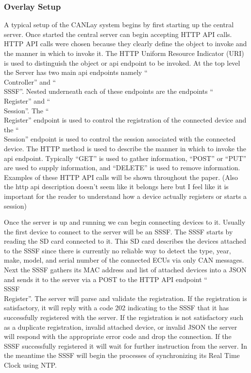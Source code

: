 \documentclass[letterpaper,twocolumn,12pt]{article}
\begin{document}
\subsubsection{Overlay Setup}
A typical setup of the CANLay system begins by first starting up the central server. Once started the central server can begin accepting HTTP API calls. HTTP API calls were chosen because they clearly define the object to invoke and the manner in which to invoke it. The HTTP Uniform Resource Indicator (URI) is used to distinguish the object or api endpoint to be invoked. At the top level the Server has two main api endpoints namely “\\Controller” and “\\SSSF”. Nested underneath each of these endpoints are the endpoints “\\Register” and “\\Session”. The “\\Register” endpoint is used to control the registration of the connected device and the “\\Session” endpoint is used to control the session associated with the connected device. The HTTP method is used to describe the manner in which to invoke the api endpoint. Typically “GET” is used to gather information, “POST” or “PUT” are used to supply information, and “DELETE” is used to remove information. Examples of these HTTP API calls will be shown throughout the paper. (Also the http api description doesn’t seem like it belongs here but I feel like it is important for the reader to understand how a device actually registers or starts a session)

Once the server is up and running we can begin connecting devices to it. Usually the first device to connect to the server will be an SSSF. The SSSF starts by reading the SD card connected to it. This SD card describes the devices attached to the SSSF since there is currently no reliable way to detect the type, year, make, model, and serial number of the connected ECUs via only CAN messages. Next the SSSF gathers its MAC address and list of attached devices into a JSON and sends it to the server via a POST to the HTTP API endpoint “\\SSSF\\Register”. The server will parse and validate the registration. If the registration is satisfactory, it will reply with a code 202 indicating to the SSSF that it has successfully registered with the server. If the registration is not satisfactory such as a duplicate registration, invalid attached device, or invalid JSON the server will respond with the appropriate error code and drop the connection. If the SSSF successfully registered it will wait for further instruction from the server. In the meantime the SSSF will begin the processes of synchronizing its Real Time Clock using NTP.
\end{document}
